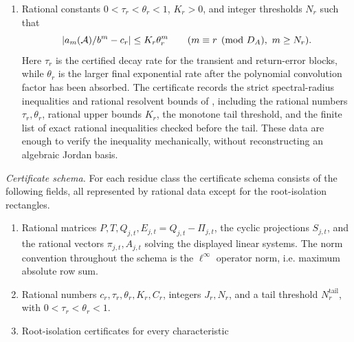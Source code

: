\begin{theorem}
\begin{enumerate}[label=\textup{(\alph*)}]
    \(D_A=\operatorname{lcm}_j d_j\), the compressed formula
    \[
      c_r=
      \sum_{j=1}^s\sum_{t=0}^{d_j-1}
      \alpha_{j,t}^{(r)}\,
      \pi_{j,t+r}(F\cap R_{j,t+r}),
      \tag{\(*\)}
      \label{eq:compressed-cr}
    \]
    where
    \[
      \alpha_{j,t}^{(r)}=
      \begin{cases}
        1, & q_0\in R_{j,t},\\
        A_{j,t}(q_0), & q_0\in T,\\
        0, & \text{otherwise.}
      \end{cases}
    \]
    Again all cyclic indices are read modulo \(d_j\). This formula
    decides \(c_r=0\) or \(c_r>0\) by exact rational arithmetic.
    \item Rational constants \(0<\tau_r<\theta_r<1\), \(K_r>0\), and
    integer thresholds \(N_r\) such that
    \[
      \lvert a_m(\mathcal A)/b^m-c_r \rvert\le K_r\theta_r^m
      \qquad(m\equiv r\pmod {D_A},\ m\ge N_r).
    \]
    Here \(\tau_r\) is the certified decay rate for the transient and
    return-error blocks, while \(\theta_r\) is the larger final
    exponential rate after the polynomial convolution factor has been
    absorbed. The certificate records the strict spectral-radius
    inequalities and rational resolvent bounds of
    , including the rational
    numbers \(\tau_r,\theta_r\), rational upper bounds \(K_r\), the
    monotone tail threshold, and the finite list of exact rational
    inequalities checked before the tail. These data are enough to
    verify the inequality mechanically, without reconstructing an
    algebraic Jordan basis.
  \end{enumerate}
  \smallskip
  \noindent\textit{Certificate schema.}
  For each residue class the certificate schema consists of the
  following fields, all represented by rational data except for the
  root-isolation rectangles.
  \begin{enumerate}[label=\textup{(\roman*)}]
    \item Rational matrices \(P,T,Q_{j,t},E_{j,t}=Q_{j,t}-\Pi_{j,t}\),
    the cyclic projections \(S_{j,t}\), and the rational vectors
    \(\pi_{j,t},A_{j,t}\) solving the displayed linear systems.
    The norm convention throughout the schema is the
    \(\ell^\infty\) operator norm, i.e. maximum absolute row sum.
    \item Rational numbers \(c_r,\tau_r,\theta_r,K_r,C_r\), integers
    \(J_r,N_r\), and a tail threshold \(N_r^{\mathrm{tail}}\), with
    \(0<\tau_r<\theta_r<1\).
    \item Root-isolation certificates for every characteristic

\end{enumerate}
\end{theorem}
